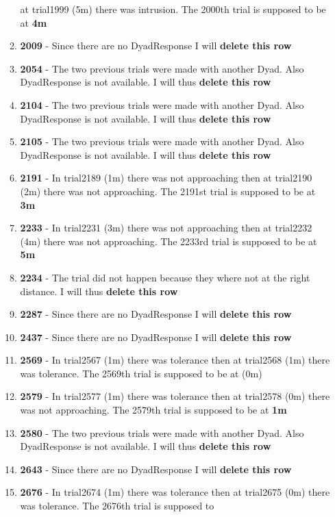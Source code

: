 \documentclass[
]{article}
\begin{document}
\begin{itemize}
\begin{enumerate}
    at trial1999 (5m) there was intrusion. The 2000th trial is supposed
    to be at \textbf{4m}
  \item
    \textbf{2009} - Since there are no DyadResponse I will
    \textbf{delete this row}
  \item
    \textbf{2054} - The two previous trials were made with another Dyad.
    Also DyadResponse is not available. I will thus \textbf{delete this
    row}
  \item
    \textbf{2104} - The two previous trials were made with another Dyad.
    Also DyadResponse is not available. I will thus \textbf{delete this
    row}
  \item
    \textbf{2105} - The two previous trials were made with another Dyad.
    Also DyadResponse is not available. I will thus \textbf{delete this
    row}
  \item
    \textbf{2191} - In trial2189 (1m) there was not approaching then at
    trial2190 (2m) there was not approaching. The 2191st trial is
    supposed to be at \textbf{3m}
  \item
    \textbf{2233} - In trial2231 (3m) there was not approaching then at
    trial2232 (4m) there was not approaching. The 2233rd trial is
    supposed to be at \textbf{5m}
  \item
    \textbf{2234} - The trial did not happen because they where not at
    the right distance. I will thus \textbf{delete this row}
  \item
    \textbf{2287} - Since there are no DyadResponse I will
    \textbf{delete this row}
  \item
    \textbf{2437} - Since there are no DyadResponse I will
    \textbf{delete this row}
  \item
    \textbf{2569} - In trial2567 (1m) there was tolerance then at
    trial2568 (1m) there was tolerance. The 2569th trial is supposed to
    be at (0m)
  \item
    \textbf{2579} - In trial2577 (1m) there was tolerance then at
    trial2578 (0m) there was not approaching. The 2579th trial is
    supposed to be at \textbf{1m}
  \item
    \textbf{2580} - The two previous trials were made with another Dyad.
    Also DyadResponse is not available. I will thus \textbf{delete this
    row}
  \item
    \textbf{2643} - Since there are no DyadResponse I will
    \textbf{delete this row}
  \item
    \textbf{2676} - In trial2674 (1m) there was tolerance then at
    trial2675 (0m) there was tolerance. The 2676th trial is supposed to

\end{enumerate}
\end{itemize}
\end{document}

